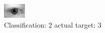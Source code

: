 \begin{figure}[h!]
\begin{center}
\includegraphics[width=0.60\columnwidth]{figures/ID630_class_2_target_3.png}
\end{center}
\caption{ Classification: 2 actual target: 3}
\label{fig:ID630_class_2_target_3}
\end{figure}
